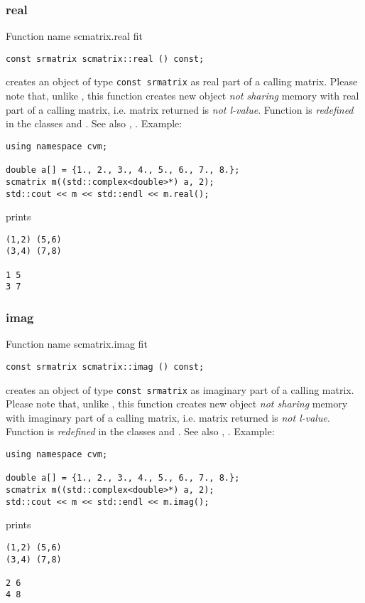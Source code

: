 \subsubsection{real}
Function%
\pdfdest name {scmatrix.real} fit
\begin{verbatim}
const srmatrix scmatrix::real () const;
\end{verbatim}
creates an object of type \verb"const srmatrix"
as  real part
of a calling matrix.
Please note that, unlike
, this
function creates new object \emph{not sharing}  memory
with  real part of a calling matrix, i.e.
 matrix returned is \emph{not  l-value}.
Function is \emph{redefined} in the classes
 and
.
See also
,
.
Example:
\begin{Verbatim}
using namespace cvm;

double a[] = {1., 2., 3., 4., 5., 6., 7., 8.};
scmatrix m((std::complex<double>*) a, 2);
std::cout << m << std::endl << m.real();
\end{Verbatim}
prints
\begin{Verbatim}
(1,2) (5,6)
(3,4) (7,8)

1 5
3 7
\end{Verbatim}
\newpage




\subsubsection{imag}
Function%
\pdfdest name {scmatrix.imag} fit
\begin{verbatim}
const srmatrix scmatrix::imag () const;
\end{verbatim}
creates an object of type \verb"const srmatrix"
as  imaginary part
of a calling matrix.
Please note that, unlike
, this
function creates new object \emph{not sharing}  memory
with  imaginary part of a calling matrix, i.e.
 matrix returned is \emph{not  l-value}.
Function is \emph{redefined} in the classes
 and
.
See also
,
.
Example:
\begin{Verbatim}
using namespace cvm;

double a[] = {1., 2., 3., 4., 5., 6., 7., 8.};
scmatrix m((std::complex<double>*) a, 2);
std::cout << m << std::endl << m.imag();
\end{Verbatim}
prints
\begin{Verbatim}
(1,2) (5,6)
(3,4) (7,8)

2 6
4 8
\end{Verbatim}
\newpage




